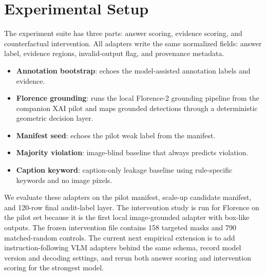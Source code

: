 \section{Experimental Setup}

The experiment suite has three parts: answer scoring, evidence scoring, and counterfactual intervention. All adapters write the same normalized fields: answer label, evidence regions, invalid-output flag, and provenance metadata.

\begin{itemize}
\item \textbf{Annotation bootstrap}: echoes the model-assisted annotation labels and evidence.
\item \textbf{Florence grounding}: runs the local Florence-2 grounding pipeline from the companion XAI pilot and maps grounded detections through a deterministic geometric decision layer.
\item \textbf{Manifest seed}: echoes the pilot weak label from the manifest.
\item \textbf{Majority violation}: image-blind baseline that always predicts violation.
\item \textbf{Caption keyword}: caption-only leakage baseline using rule-specific keywords and no image pixels.
\end{itemize}

We evaluate these adapters on the pilot manifest, scale-up candidate manifest, and 120-row final audit-label layer. The intervention study is run for Florence on the pilot set because it is the first local image-grounded adapter with box-like outputs. The frozen intervention file contains 158 targeted masks and 790 matched-random controls. The current next empirical extension is to add instruction-following VLM adapters behind the same schema, record model version and decoding settings, and rerun both answer scoring and intervention scoring for the strongest model.
